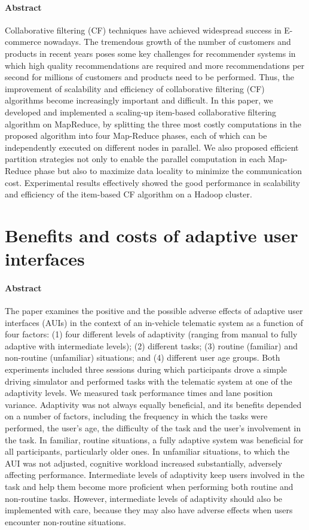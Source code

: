 \documentclass[oneside]{book}
\begin{document}
\paragraph{Abstract}
Collaborative filtering (CF) techniques have achieved widespread success in E-commerce nowadays. The tremendous growth of the number of customers and products in recent years poses some key challenges for recommender systems in which high quality recommendations are required and more recommendations per second for millions of customers and products need to be performed. Thus, the improvement of scalability and efficiency of collaborative filtering (CF) algorithms become increasingly important and difficult. In this paper, we developed and implemented a scaling-up item-based collaborative filtering algorithm on MapReduce, by splitting the three most costly computations in the proposed algorithm into four Map-Reduce phases, each of which can be independently executed on different nodes in parallel. We also proposed efficient partition strategies not only to enable the parallel computation in each Map-Reduce phase but also to maximize data locality to minimize the communication cost. Experimental results effectively showed the good performance in scalability and efficiency of the item-based CF algorithm on a Hadoop cluster.
\section{Benefits and costs of adaptive user interfaces}
\paragraph{Abstract}
The paper examines the positive and the possible adverse effects of adaptive user interfaces (AUIs) in the context of an in-vehicle
telematic system as a function of four factors: (1) four different levels of adaptivity (ranging from manual to fully adaptive with
intermediate levels); (2) different tasks; (3) routine (familiar) and non-routine (unfamiliar) situations; and (4) different user age groups.
Both experiments included three sessions during which participants drove a simple driving simulator and performed tasks with the
telematic system at one of the adaptivity levels. We measured task performance times and lane position variance. Adaptivity was not
always equally beneficial, and its benefits depended on a number of factors, including the frequency in which the tasks were performed,
the user’s age, the difficulty of the task and the user’s involvement in the task. In familiar, routine situations, a fully adaptive system was
beneficial for all participants, particularly older ones. In unfamiliar situations, to which the AUI was not adjusted, cognitive workload
increased substantially, adversely affecting performance. Intermediate levels of adaptivity keep users involved in the task and help them
become more proficient when performing both routine and non-routine tasks. However, intermediate levels of adaptivity should also be
implemented with care, because they may also have adverse effects when users encounter non-routine situations.
\end{document}
